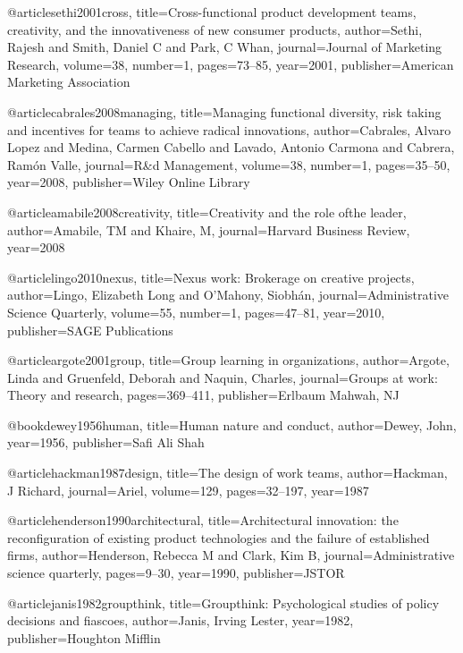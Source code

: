 @article{sethi2001cross,
  title={Cross-functional product development teams, creativity, and the innovativeness of new consumer products},
  author={Sethi, Rajesh and Smith, Daniel C and Park, C Whan},
  journal={Journal of Marketing Research},
  volume={38},
  number={1},
  pages={73--85},
  year={2001},
  publisher={American Marketing Association}
}

@article{cabrales2008managing,
  title={Managing functional diversity, risk taking and incentives for teams to achieve radical innovations},
  author={Cabrales, Alvaro Lopez and Medina, Carmen Cabello and Lavado, Antonio Carmona and Cabrera, Ram{\'o}n Valle},
  journal={R\&d Management},
  volume={38},
  number={1},
  pages={35--50},
  year={2008},
  publisher={Wiley Online Library}
}

@article{amabile2008creativity,
  title={Creativity and the role ofthe leader},
  author={Amabile, TM and Khaire, M},
  journal={Harvard Business Review},
  year={2008}
}

@article{lingo2010nexus,
  title={Nexus work: Brokerage on creative projects},
  author={Lingo, Elizabeth Long and O'Mahony, Siobh{\'a}n},
  journal={Administrative Science Quarterly},
  volume={55},
  number={1},
  pages={47--81},
  year={2010},
  publisher={SAGE Publications}
}

@article{argote2001group,
  title={Group learning in organizations},
  author={Argote, Linda and Gruenfeld, Deborah and Naquin, Charles},
  journal={Groups at work: Theory and research},
  pages={369--411},
  publisher={Erlbaum Mahwah, NJ}
}

@book{dewey1956human,
  title={Human nature and conduct},
  author={Dewey, John},
  year={1956},
  publisher={Safi Ali Shah}
}

@article{hackman1987design,
  title={The design of work teams},
  author={Hackman, J Richard},
  journal={Ariel},
  volume={129},
  pages={32--197},
  year={1987}
}

@article{henderson1990architectural,
  title={Architectural innovation: the reconfiguration of existing product technologies and the failure of established firms},
  author={Henderson, Rebecca M and Clark, Kim B},
  journal={Administrative science quarterly},
  pages={9--30},
  year={1990},
  publisher={JSTOR}
}

@article{janis1982groupthink,
  title={Groupthink: Psychological studies of policy decisions and fiascoes},
  author={Janis, Irving Lester},
  year={1982},
  publisher={Houghton Mifflin}
}

